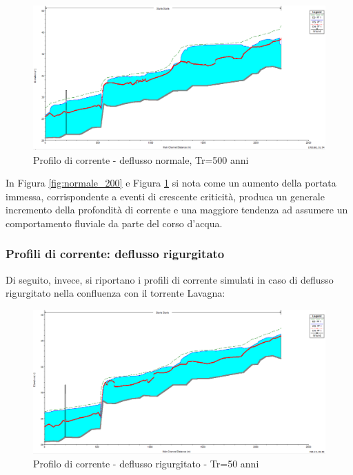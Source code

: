\documentclass[12pt]{article} %
\begin{document}
\begin{figure}[H]
    \centering
    \includegraphics[scale=0.5]{ProfU1223.PNG}
    \caption{Profilo di corrente - deflusso normale, Tr=500 anni}
    \label{fig:normale_500}
\end{figure}

\noindent In Figura \ref{fig:normale_200} e Figura \ref{fig:normale_500} si nota come un aumento della portata immessa, corrispondente a eventi di crescente criticità, produca un generale incremento della profondità di corrente e una maggiore tendenza ad assumere un comportamento fluviale da parte del corso d'acqua.

\newpage
\subsubsection{Profili di corrente: deflusso rigurgitato}
\noindent Di seguito, invece, si riportano i profili di corrente simulati in caso di deflusso rigurgitato nella confluenza con il torrente Lavagna:

\begin{figure}[H]
    \centering
    \includegraphics[scale=0.5]{Prof56.PNG}
    \caption{Profilo di corrente - deflusso rigurgitato - Tr=50 anni}
\end{figure}
\end{document}
